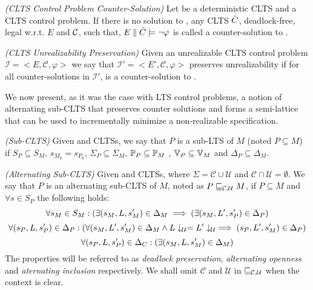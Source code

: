 

\begin{definition}
	\label{def:clts_counter_solution} \emph{(CLTS Control Problem Counter-Solution)} 
	Let  be a deterministic CLTS and \controlProblemDef a CLTS control problem. If there is no solution to 
	\controlProblem, 
	any CLTS $\bar{C}$, deadlock-free, legal w.r.t. $E$ and $\mathcal{C}$, such that, $E \parallel \bar{C} \models \neg\varphi$ is called a counter-solution to \controlProblem.
\end{definition}


\begin{definition}\label{}\emph{(CLTS Unrealizability Preservation)}
Given an unrealizable CLTS control problem $\mathcal{I} = <E, \mathcal{C}, \varphi>$ we say
that $\mathcal{I'} = <E', \mathcal{C}, \varphi>$ preserves unrealizability
 if for all counter-solutions \advCtrl in $\mathcal{I'}$, \advCtrl is a counter-solution to \controlProblem.
\end{definition}

We now present, as it was the case with LTS control problems, a notion of alternating sub-CLTS that preserves counter solutions and forms a semi-lattice that can be used to incrementally minimize a non-realizable specification. 

\begin{definition}\label{def:clts-inclusion}\emph{(Sub-CLTS)}
Given  and
 CLTSs, 
we say that $P$ is a sub-LTS of $M$ (noted $P \subseteq M$) if $S_P \subseteq S_M$,
$s_{M_0} = s_{P_0}$, $\Sigma_P \subseteq \Sigma_M$, $\mathbb{P}_P \subseteq \mathbb{P}_M$ , $\mathbb{V}_P \subseteq \mathbb{V}_M$ and $\Delta_P \subseteq \Delta_M$.
\end{definition}


\begin{definition}\label{def:alternating_sub_clts}\emph{(Alternating Sub-CLTS)}
Given  and
 CLTSs, 
where $\Sigma =\mathcal{C}\cup \mathcal{U}$ and $\mathcal{C}\cap
\mathcal{U}=\emptyset$. We say that $P$ is an alternating
 sub-CLTS of $M$, noted as $P \sqsubseteq_{\mathcal{C},\mathcal{U}} M$, if  $P \subseteq M$  and $\forall s \in S_{P}$ the following holds:
 	\[\forall s_{M} \in S_{M}:(\exists (s_M,L,s'_M) \in \Delta_M \implies (\exists (s_M,L',s'_P) \in \Delta_P)\]
	\[\forall (s_P,L,s'_P) \in \Delta_P : (\forall (s_M,L',s'_M)\in \Delta_M \wedge L\downarrow_{\mathcal{U}} = L'\downarrow_{\mathcal{U}} \implies (s_P,L',s'_M) \in \Delta_P )\]
	\[\forall (s_P, L, s'_P) \in \Delta_C:( \exists (s_M, L, s'_M) \in \Delta_M)\]	
The properties will be referred to as \emph{deadlock preservation}, \emph{alternating openness} and \emph{aternating inclusion} respectively. We shall omit $\mathcal{C}$ and $\mathcal{U}$ in $\sqsubseteq_{\mathcal{C},\mathcal{U}}$ when the context is clear. 
 \end{definition}

